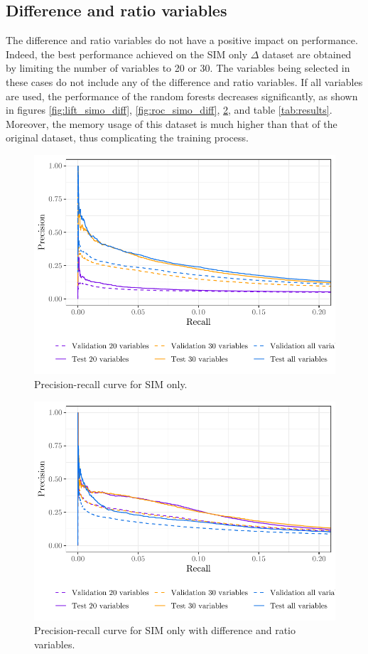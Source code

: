\subsection{Difference and ratio variables}

The difference and ratio variables do not have a positive impact on performance.
Indeed, the best performance achieved on the SIM only $\Delta$ dataset are
obtained by limiting the number of variables to 20 or 30. The variables being
selected in these cases do not include any of the difference and ratio
variables. If all variables are used, the performance of the random forests
decreases significantly, as shown in figures \ref{fig:lift_simo_diff},
\ref{fig:roc_simo_diff}, \ref{fig:pr_simo_diff}, and table \ref{tab:results}.
Moreover, the memory usage of this dataset is much higher than that of the
original dataset, thus complicating the training process.

\begin{figure}
    \centering
    \includegraphics[width=0.9\linewidth]{figures/pr_simo.pdf}
    \caption{Precision-recall curve for SIM only.}
    \label{fig:pr_simo}
\end{figure}

\begin{figure}
    \centering
    \includegraphics[width=0.9\linewidth]{figures/pr_simo_diff.pdf}
    \caption{Precision-recall curve for SIM only with difference and ratio
    variables.}
    \label{fig:pr_simo_diff}
\end{figure}

